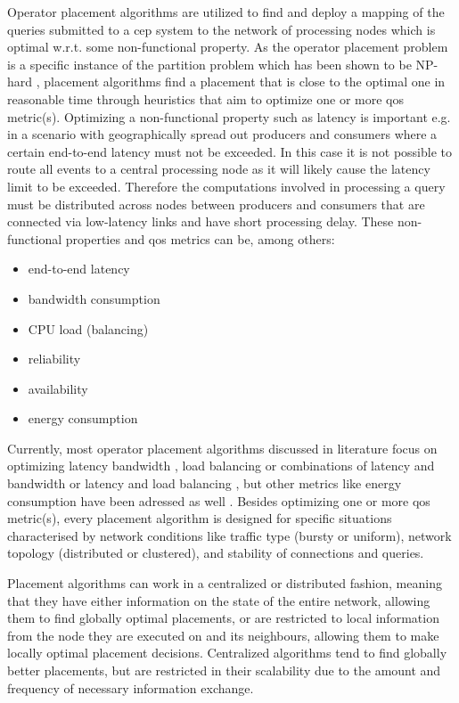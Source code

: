Operator placement algorithms are utilized to find and deploy a mapping of the queries submitted to a \gls{cep} system to the network of processing nodes which is optimal w.r.t. some non-functional property.
As the operator placement problem is a specific instance of the partition problem which has been shown to be NP-hard \cite{Cardellini2016}, placement algorithms find a placement that is close to the optimal one in reasonable time through heuristics that aim to optimize one or more \gls{qos} metric(s).
Optimizing a non-functional property such as latency is important e.g. in a scenario with geographically spread out producers and consumers where a certain end-to-end latency must not be exceeded. In this case it is not possible to route all events to a central processing node as it will likely cause the latency limit to be exceeded. Therefore the computations involved in processing a query must be distributed across nodes between producers and consumers that are connected via low-latency links and have short processing delay.
These non-functional properties and \gls{qos} metrics can be, among others: 
\begin{itemize}
\item end-to-end latency 
\item bandwidth consumption
\item CPU load (balancing)
\item reliability
\item availability
\item energy consumption
\end{itemize}
Currently, most operator placement algorithms discussed in literature focus on optimizing latency \cite{Pandit2004} bandwidth \cite{Ahmad2004} \cite{Schilling2011}, load balancing \cite{Xing2005} or combinations of latency and bandwidth  \cite{Pietzuch2006} \cite{Rizou2010} or latency and load balancing \cite{Heinze2013}, but other metrics like energy consumption have been adressed as well \cite{Bonfils2004}. 
Besides optimizing one or more \gls{qos} metric(s), every placement algorithm is designed for specific situations characterised by network conditions like traffic type (bursty or uniform), network topology (distributed or clustered), and stability of connections and queries. 

Placement algorithms can work in a centralized or distributed fashion, meaning that they have either information on the state of the entire network, allowing them to find globally optimal placements, or are restricted to local information from the node they are executed on and its neighbours, allowing them to make locally optimal placement decisions. Centralized algorithms tend to find globally better placements, but are restricted in their scalability due to the amount and frequency of necessary information exchange. 

